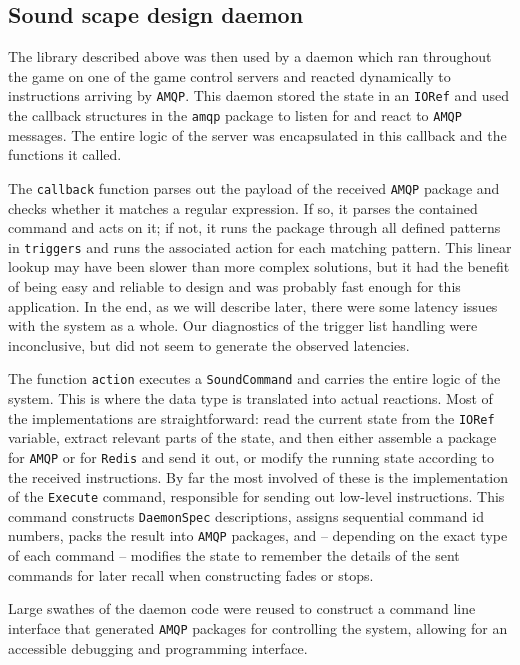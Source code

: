 \subsection{Sound scape design daemon}
\label{sec:sound-scape-design}

The library described above was then used by a daemon which ran
throughout the game on one of the game control servers and reacted
dynamically to instructions arriving by \texttt{AMQP}. This daemon stored
the state in an
\texttt{IORef} and used the
callback structures in the \texttt{amqp} package to listen for and
react to \texttt{AMQP} messages. The entire logic of the server was encapsulated
in this callback and the functions it called.

The \texttt{callback} function parses out the payload of the received \texttt{AMQP}
package and checks whether it matches a regular expression. If so, it parses the contained command and acts on it; if not, it runs
the package through all defined patterns in \texttt{triggers} and runs
the associated action for each matching pattern. This linear lookup
may have been slower than more complex solutions, but it had the benefit
of being easy and reliable to design and was probably fast
enough for this application. In the end, as we will describe later,
there were some latency issues with the system as a whole. Our
diagnostics of the trigger list handling were inconclusive, but did
not seem to generate the observed latencies.

The function \texttt{action} executes a \texttt{SoundCommand} and
carries the entire logic of the system. This is where the data type is
translated into actual reactions. Most of the implementations are
straightforward: read the current state from the \texttt{IORef}
variable, extract relevant parts of the state, and then either assemble a package for
\texttt{AMQP} or for \texttt{Redis} and send it out, or modify the running state
according to the received instructions. By far the most involved of
these is the implementation of the \texttt{Execute} command,
responsible for sending out low-level instructions. This command constructs
\texttt{DaemonSpec} descriptions, assigns sequential command id
numbers, packs the result into \texttt{AMQP} packages, and -- depending on the
exact type of each command -- modifies the state to remember the details
of the sent commands for later recall when constructing fades or
stops.

Large swathes of the daemon code were reused to construct a command
line interface that generated \texttt{AMQP} packages for controlling the
system, allowing for an accessible debugging and programming interface.



